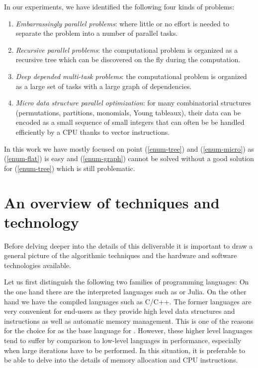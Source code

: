 \documentclass{deliverablereport}
\begin{document}
In our experiments, we have identified the following four kinds of problems:
\begin{enumerate}
\item\label{enum-flat} \emph{Embarrassingly parallel problems}: where
  little or no effort is needed to separate the problem into a number of
  parallel tasks.
\item\label{enum-tree} \emph{Recursive parallel problems}: the computational
  problem is organized as a recursive tree which can be discovered on the fly
  during the computation.
\item\label{enum-graph} \emph{Deep depended multi-task problems}:
  the computational problem is organized as a large set of tasks with a large
  graph of dependencies.
\item\label{enum-micro} \emph{Micro data structure parallel optimization}:
  for many combinatorial structures (permutations, partitions, monomials, Young
  tableaux), their data can be encoded as a small sequence of small integers
  that can often be be handled efficiently by a CPU thanks to vector instructions.
\end{enumerate}
In this work we have mostly focused on point (\ref{enum-tree}) and
(\ref{enum-micro}) as (\ref{enum-flat}) is easy and (\ref{enum-graph}) cannot
be solved without a good solution for (\ref{enum-tree}) which is still
problematic.


\section{An overview of techniques and technology}

Before delving deeper into the details of this deliverable it is important to
draw a general picture of the algorithmic techniques and the hardware and
software technologies available.

Let us first distinguish the following two families of programming
languages: On the one hand there are the interpreted languages
such as \Python or Julia. On the other hand we have the compiled languages
such as C/C++. The former languages are very convenient for end-users as
they provide high level data structures and instructions as well as automatic
memory management. This is one of the reasons for the choice for \Python as the
base language for \Sage. However, these higher level languages tend to suffer
by comparison to low-level languages in performance, especially when large
iterations have to be performed. In this situation, it is preferable to be able
to delve into the details of memory allocation and CPU instructions.
\end{document}
